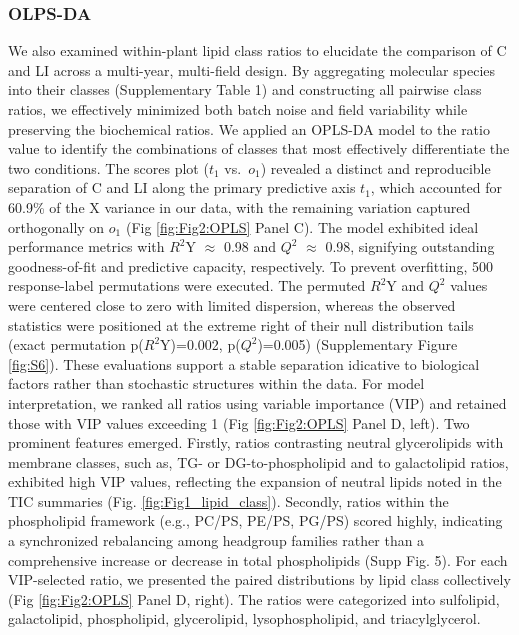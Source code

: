 \documentclass[10pt,letterpaper]{article}
\begin{document}
\begin{itemize}
\subsubsection*{OLPS-DA}
We also examined within-plant lipid class ratios to elucidate the comparison of C and LI across a multi-year, multi-field design. By aggregating molecular species into their classes (Supplementary Table 1) and constructing all pairwise class ratios, we effectively minimized both batch noise and field variability while preserving the biochemical ratios. We applied an OPLS-DA model to the ratio value to identify the combinations of classes that most effectively differentiate the two conditions. The scores plot ($t_1$ vs.\ $o_1$) revealed a distinct and reproducible separation of C and LI along the primary predictive axis $t_1$, which accounted for 60.9\% of the X variance in our data, with the remaining variation captured orthogonally on $o_1$ (Fig \ref{fig:Fig2:OPLS} Panel C). The model exhibited ideal performance metrics with $R^2$Y $\approx$ 0.98 and $Q^2$ $\approx$ 0.98, signifying outstanding goodness-of-fit and predictive capacity, respectively. To prevent overfitting, 500 response-label permutations were executed. The permuted $R^2$Y and $Q^2$ values were centered close to zero with limited dispersion, whereas the observed statistics were positioned at the extreme right of their null distribution tails (exact permutation p($R^2$Y)=0.002, p($Q^2$)=0.005) (Supplementary Figure \ref{fig:S6}). These evaluations support a stable separation idicative to biological factors rather than stochastic structures within the data. For model interpretation, we ranked all ratios using variable importance (VIP) and retained those with VIP values exceeding 1 (Fig \ref{fig:Fig2:OPLS} Panel D, left). Two prominent features emerged. Firstly, ratios contrasting neutral glycerolipids with membrane classes, such as, TG- or DG-to-phospholipid and to galactolipid ratios, exhibited high VIP values, reflecting the expansion of neutral lipids noted in the TIC summaries (Fig. \ref{fig:Fig1_lipid_class}). Secondly, ratios within the phospholipid framework (e.g., PC/PS, PE/PS, PG/PS) scored highly, indicating a synchronized rebalancing among headgroup families rather than a comprehensive increase or decrease in total phospholipids (Supp Fig. 5). For each VIP-selected ratio, we presented the paired distributions by lipid class collectively (Fig \ref{fig:Fig2:OPLS} Panel D, right). The ratios were categorized into sulfolipid, galactolipid, phospholipid, glycerolipid, lysophospholipid, and triacylglycerol. 


\end{itemize}
\end{document}
